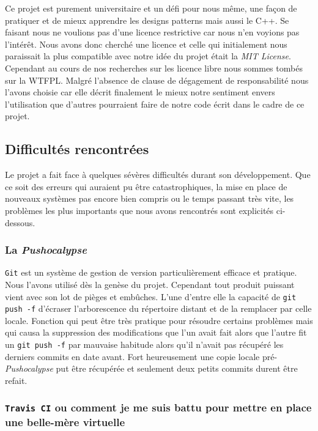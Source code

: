 \documentclass{article}
\newcommand{\info}{\texttt}
\begin{document}
        Ce projet est purement universitaire et un défi pour nous même, une façon de pratiquer et de mieux apprendre les designs patterns mais aussi le C++. Se faisant nous ne voulions pas d'une licence restrictive car nous n'en voyions pas l'intérêt. Nous avons donc cherché une licence et celle qui initialement nous paraissait la plus compatible avec notre idée du projet était la \emph{MIT License}. Cependant au cours de nos recherches sur les licence libre nous sommes tombés sur la WTFPL. Malgré l'absence de clause de dégagement de responsabilité nous l'avons choisie car elle décrit finalement le mieux notre sentiment envers l'utilisation que d'autres pourraient faire de notre code écrit dans le cadre de ce projet.
    
    \subsection{Difficultés rencontrées}
    
        Le projet a fait face à quelques sévères difficultés durant son développement. Que ce soit des erreurs qui auraient pu être catastrophiques, la mise en place de nouveaux systèmes pas encore bien compris ou le temps passant très vite, les problèmes les plus importants que nous avons rencontrés sont explicités ci-dessous.
    
        \subsubsection{La \emph{Pushocalypse}}
        
            \info{Git} est un système de gestion de version particulièrement efficace et pratique. Nous l'avons utilisé dès la genèse du projet. Cependant tout produit puissant vient avec son lot de pièges et embûches. L'une d'entre elle la capacité de \info{git push -f} d'écraser l'arborescence du répertoire distant et de la remplacer par celle locale. Fonction qui peut être très pratique pour résoudre certains problèmes mais qui causa la suppression des modifications que l'un avait fait alors que l'autre fit un \info{git push -f} par mauvaise habitude alors qu'il n'avait pas récupéré les derniers commits en date avant. Fort heureusement une copie locale pré-\emph{Pushocalypse} put être récupérée et seulement deux petits commits durent être refait.
        
        \subsubsection{\info{Travis CI} ou comment je me suis battu pour mettre en place une belle-mère virtuelle}
        
\end{document}
